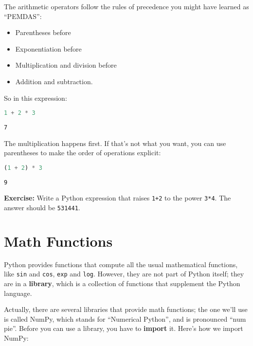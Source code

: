 The arithmetic operators follow the rules of precedence you might have
learned as ``PEMDAS'':

\begin{itemize}

\item
  Parentheses before
\item
  Exponentiation before
\item
  Multiplication and division before
\item
  Addition and subtraction.
\end{itemize}

So in this expression:

\begin{lstlisting}[language=Python,style=source]
1 + 2 * 3
\end{lstlisting}

\begin{lstlisting}[style=output]
7
\end{lstlisting}

The multiplication happens first. If that's not what you want, you can
use parentheses to make the order of operations explicit:

\begin{lstlisting}[language=Python,style=source]
(1 + 2) * 3
\end{lstlisting}

\begin{lstlisting}[style=output]
9
\end{lstlisting}

\textbf{Exercise:} Write a Python expression that raises
\passthrough{\lstinline!1+2!} to the power
\passthrough{\lstinline!3*4!}. The answer should be
\passthrough{\lstinline!531441!}.

\hypertarget{math-functions}{%
\section{Math Functions}\label{math-functions}}

Python provides functions that compute all the usual mathematical
functions, like \passthrough{\lstinline!sin!} and
\passthrough{\lstinline!cos!}, \passthrough{\lstinline!exp!} and
\passthrough{\lstinline!log!}. However, they are not part of Python
itself; they are in a \textbf{library}, which is a collection of
functions that supplement the Python language.

Actually, there are several libraries that provide math functions; the
one we'll use is called NumPy, which stands for ``Numerical Python'',
and is pronounced ``num pie''. Before you can use a library, you have to
\textbf{import} it. Here's how we import NumPy:

